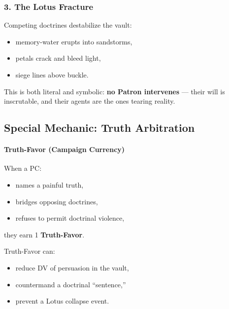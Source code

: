\documentclass[11pt]{article}
\newcommand{\Term}[1]{\textbf{#1}}
\begin{document}
\bigskip

\subsubsection*{3. The Lotus Fracture}

Competing doctrines destabilize the vault:

\begin{itemize}[leftmargin=*]
  \item memory-water erupts into sandstorms,
  \item petals crack and bleed light,
  \item siege lines above buckle.
\end{itemize}

This is both literal and symbolic:
\textbf{no Patron intervenes} --- their will is inscrutable,
and their agents are the ones tearing reality.

\bigskip

\subsection*{Special Mechanic: Truth Arbitration}

\paragraph{Truth-Favor (Campaign Currency)}

When a PC:
\begin{itemize}[leftmargin=*]
  \item names a painful truth,
  \item bridges opposing doctrines,
  \item refuses to permit doctrinal violence,
\end{itemize}

they earn 1 \Term{Truth-Favor}.

Truth-Favor can:
\begin{itemize}[leftmargin=*]
  \item reduce DV of persuasion in the vault,
  \item countermand a doctrinal ``sentence,''
  \item prevent a Lotus collapse event.
\end{itemize}

\bigskip

\end{document}
